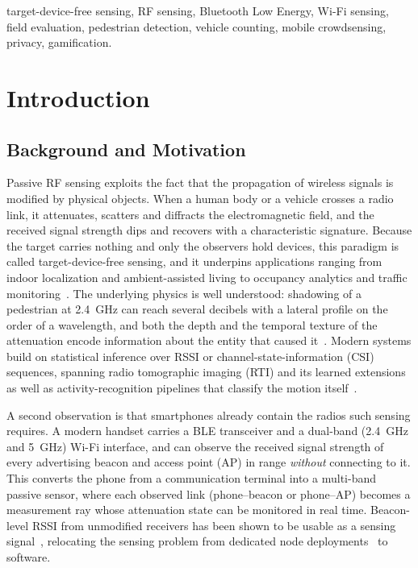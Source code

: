 \documentclass[journal,10pt]{IEEEtran}
\begin{document}
\begin{IEEEkeywords}
target-device-free sensing, RF sensing, Bluetooth Low Energy, Wi-Fi sensing,
field evaluation, pedestrian detection, vehicle counting, mobile
crowdsensing, privacy, gamification.
\end{IEEEkeywords}

\section{Introduction}
\subsection{Background and Motivation}
Passive RF sensing exploits the fact that the propagation of wireless
signals is modified by physical objects. When a human body or a vehicle
crosses a radio link, it attenuates, scatters and diffracts the
electromagnetic field, and the received signal strength dips and recovers
with a characteristic signature. Because the target carries nothing and only the observers hold
devices, this paradigm is called target-device-free sensing, and it
underpins applications ranging from indoor localization and
ambient-assisted living to occupancy analytics and traffic monitoring~\cite{wilson2010,herrera2010}. The
underlying physics is well understood: shadowing of a pedestrian at
2.4~GHz can reach several decibels with a lateral profile on the order of a
wavelength, and both the depth and the temporal texture of the attenuation
encode information about the entity that caused it~\cite{januszkiewicz2018}.
Modern systems build on statistical inference over RSSI or
channel-state-information (CSI) sequences, spanning radio tomographic
imaging (RTI) and its learned extensions~\cite{patwari2010proc,alippi2016,li2024,wu2024,wilson2011}
as well as activity-recognition pipelines that classify the motion
itself~\cite{wang2015har,wong2024,sanchez2020}.

A second observation is that smartphones already contain the radios such
sensing requires. A modern handset carries a BLE transceiver and a dual-band
(2.4~GHz and 5~GHz) Wi-Fi interface, and can observe the received signal
strength of every advertising beacon and access point (AP) in range
\emph{without} connecting to it. This converts the phone from a
communication terminal into a multi-band passive sensor, where each observed
link (phone--beacon or phone--AP) becomes a measurement ray whose
attenuation state can be monitored in real time. Beacon-level RSSI from
unmodified receivers has been shown to be usable as a sensing
signal~\cite{ramirez2021,milano2024,bai2020}, relocating the sensing problem
from dedicated node deployments~\cite{wilson2010,alippi2016} to software.
\end{document}
